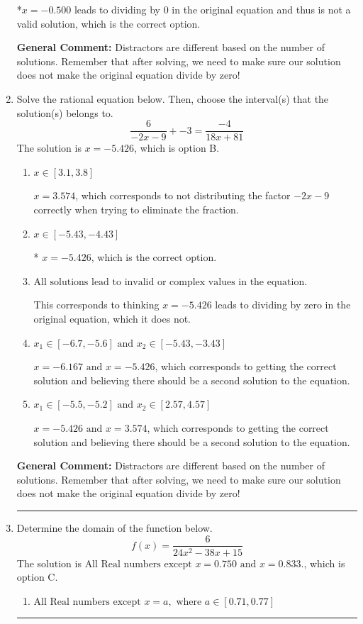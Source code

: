 \documentclass{extbook}[14pt]
\newcommand{\litem}[1]{\item #1

\rule{\textwidth}{0.4pt}}
\begin{document}
\begin{enumerate}
{\begin{enumerate}[label=\Alph*.]
*$x = -0.500$ leads to dividing by 0 in the original equation and thus is not a valid solution, which is the correct option.
\end{enumerate}

\textbf{General Comment:} Distractors are different based on the number of solutions. Remember that after solving, we need to make sure our solution does not make the original equation divide by zero!
}
\litem{
Solve the rational equation below. Then, choose the interval(s) that the solution(s) belongs to.
\[ \frac{6}{-2x -9} + -3 = \frac{-4}{18x + 81} \]The solution is \( x = -5.426 \), which is option B.\begin{enumerate}[label=\Alph*.]
\item \( x \in [3.1,3.8] \)

$x = 3.574$, which corresponds to not distributing the factor $-2x -9$ correctly when trying to eliminate the fraction.
\item \( x \in [-5.43,-4.43] \)

* $x = -5.426$, which is the correct option.
\item \( \text{All solutions lead to invalid or complex values in the equation.} \)

This corresponds to thinking $x = -5.426$ leads to dividing by zero in the original equation, which it does not.
\item \( x_1 \in [-6.7, -5.6] \text{ and } x_2 \in [-5.43,-3.43] \)

$x = -6.167 \text{ and } x = -5.426$, which corresponds to getting the correct solution and believing there should be a second solution to the equation.
\item \( x_1 \in [-5.5, -5.2] \text{ and } x_2 \in [2.57,4.57] \)

$x = -5.426 \text{ and } x = 3.574$, which corresponds to getting the correct solution and believing there should be a second solution to the equation.
\end{enumerate}

\textbf{General Comment:} Distractors are different based on the number of solutions. Remember that after solving, we need to make sure our solution does not make the original equation divide by zero!
}
\litem{
Determine the domain of the function below.
\[ f(x) = \frac{6}{24x^{2} -38 x + 15} \]The solution is \( \text{All Real numbers except } x = 0.750 \text{ and } x = 0.833. \), which is option C.\begin{enumerate}[label=\Alph*.]
\item \( \text{All Real numbers except } x = a, \text{ where } a \in [0.71, 0.77] \)


\end{enumerate}}
\end{enumerate}
\end{document}
